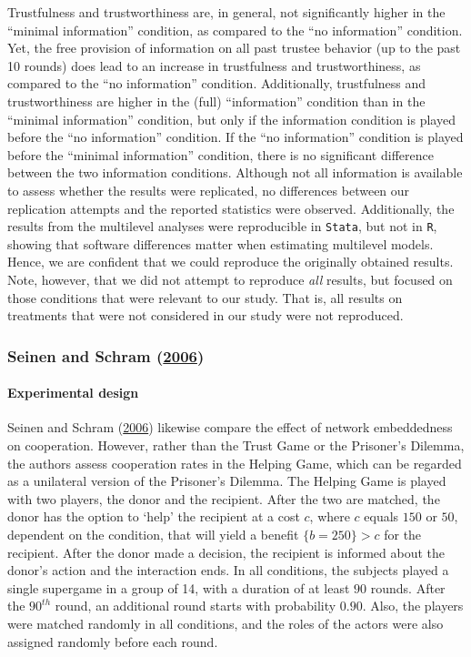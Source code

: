 \documentclass[
  11pt,
]{article}
\begin{document}
Trustfulness and trustworthiness are, in general, not significantly higher in the ``minimal information'' condition, as compared to the ``no information'' condition.
Yet, the free provision of information on all past trustee behavior (up to the past 10 rounds) does lead to an increase in trustfulness and trustworthiness, as compared to the ``no information'' condition.
Additionally, trustfulness and trustworthiness are higher in the (full) ``information'' condition than in the ``minimal information'' condition, but only if the information condition is played before the ``no information'' condition.
If the ``no information'' condition is played before the ``minimal information'' condition, there is no significant difference between the two information conditions.
Although not all information is available to assess whether the results were replicated, no differences between our replication attempts and the reported statistics were observed.
Additionally, the results from the multilevel analyses were reproducible in \texttt{Stata}, but not in \texttt{R}, showing that software differences matter when estimating multilevel models.
Hence, we are confident that we could reproduce the originally obtained results.
Note, however, that we did not attempt to reproduce \emph{all} results, but focused on those conditions that were relevant to our study.
That is, all results on treatments that were not considered in our study were not reproduced.

\hypertarget{seinen_schram_social_2006}{%
\subsubsection{\texorpdfstring{Seinen and Schram (\protect\hyperlink{ref-seinen_schram_social_2006}{2006})}{Seinen and Schram (2006)}}\label{seinen_schram_social_2006}}

\hypertarget{experimental-design-2}{%
\paragraph{Experimental design}\label{experimental-design-2}}

Seinen and Schram (\protect\hyperlink{ref-seinen_schram_social_2006}{2006}) likewise compare the effect of network embeddedness on cooperation. However, rather than the Trust Game or the Prisoner's Dilemma, the authors assess cooperation rates in the Helping Game, which can be regarded as a unilateral version of the Prisoner's Dilemma. The Helping Game is played with two players, the donor and the recipient. After the two are matched, the donor has the option to `help' the recipient at a cost \(c\), where \(c\) equals \(150\) or \(50\), dependent on the condition, that will yield a benefit \(\{b = 250\} > c\) for the recipient. After the donor made a decision, the recipient is informed about the donor's action and the interaction ends. In all conditions, the subjects played a single supergame in a group of 14, with a duration of at least \(90\) rounds. After the \(90^{th}\) round, an additional round starts with probability \(0.90\). Also, the players were matched randomly in all conditions, and the roles of the actors were also assigned randomly before each round.
\end{document}
